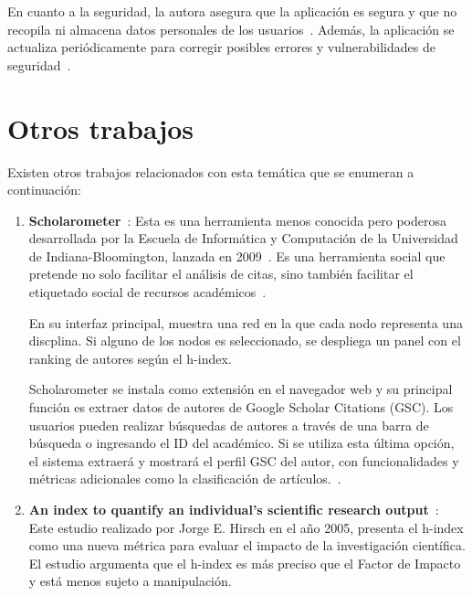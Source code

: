 En cuanto a la seguridad, la autora asegura que la aplicación es segura y que no recopila ni almacena datos personales de los usuarios~\cite{harzing2010}. Además, la aplicación se actualiza periódicamente para corregir posibles errores y vulnerabilidades de seguridad~\cite{pop2007}.





\section{Otros trabajos}

Existen otros trabajos relacionados con esta temática que se enumeran a continuación:

\begin{enumerate} 

  \item \textbf{Scholarometer}~\cite{scholarometer2018}:  Esta es una herramienta menos conocida pero poderosa desarrollada por la Escuela de Informática y Computación de la Universidad de Indiana-Bloomington, lanzada en 2009~\cite{kaur2012}. Es una herramienta social que pretende no solo facilitar el análisis de citas, sino también facilitar el etiquetado social de recursos académicos~\cite{lopez2017}.

  En su interfaz principal, muestra una red en la que cada nodo representa una discplina. Si alguno de los nodos es seleccionado, se despliega un panel con el ranking de autores según el h-index.

  
  Scholarometer se instala como extensión en el navegador web y su principal función es extraer datos de autores de Google Scholar Citations (GSC). Los usuarios pueden realizar búsquedas de autores a través de una barra de búsqueda o ingresando el ID del académico. Si se utiliza esta última opción, el sistema extraerá y mostrará el perfil GSC del autor, con funcionalidades y métricas adicionales como la clasificación de artículos.~\cite{lopez2017}.
  

  \item \textbf{An index to quantify an individual's scientific research output}~\cite{hirsch2005}:  Este estudio realizado por Jorge E. Hirsch en el año 2005, presenta el h-index como una nueva métrica para evaluar el impacto de la investigación científica. El estudio argumenta que el h-index es más preciso que el Factor de Impacto y está menos sujeto a manipulación.



\end{enumerate}
